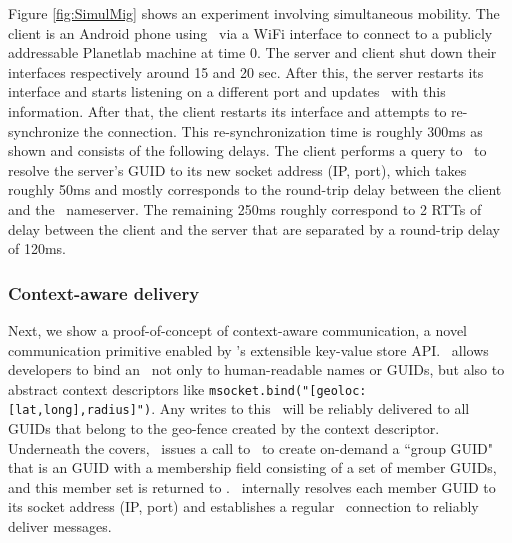 Figure \ref{fig:SimulMig} shows an experiment involving simultaneous mobility. The client is an Android phone using \msocket\ via a WiFi interface to connect to a publicly addressable Planetlab machine at time 0. The server and client shut down their interfaces respectively around 15 and 20 sec. After this, the server restarts its interface and starts listening on a different port and updates \auspice\ with this information. After that, the client restarts its interface and attempts to re-synchronize the connection. This re-synchronization time is roughly 300ms as shown and consists of the following delays. The client performs a query to \auspice\ to resolve the server's GUID to its new socket address (IP, port), which takes roughly 50ms and mostly corresponds to the round-trip delay between the client and the \auspice\ nameserver. The remaining 250ms roughly correspond to 2 RTTs of delay between the client and the server that are separated by a round-trip delay of 120ms.

\subsubsection{Context-aware delivery}
\label{sec:context}

Next, we show a proof-of-concept of context-aware communication, a novel communication primitive enabled by \auspice's extensible key-value store API. \auspice\ allows developers to bind an \msocket\ not only to human-readable names or GUIDs, but also to abstract context descriptors like \verb+msocket.bind("[geoloc:+\\
\verb+[lat,long],radius]")+. Any writes to this \msocket\ will be reliably delivered to all GUIDs that belong to the geo-fence created by the context descriptor. Underneath the covers, \msocket\ issues a call to \auspice\ to create on-demand a ``group GUID" that is an  GUID with a membership field consisting of a set of member GUIDs, and this member set is returned to \msocket. \msocket\ internally resolves each member GUID to its socket address (IP, port) and establishes a regular \msocket\ connection to reliably deliver messages.






